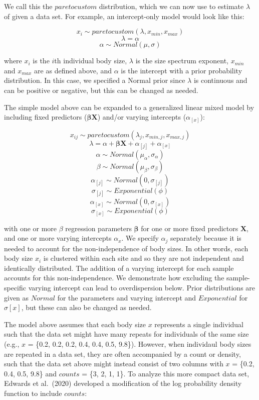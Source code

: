 \documentclass[
  12pt,
]{article}
\begin{document}
We call this the \(paretocustom\) distribution, which we can now use to
estimate \(\lambda\) of given a data set. For example, an intercept-only
model would look like this:

\[x_i \sim paretocustom(\lambda, x_{min}, x_{max})\]
\[\lambda = \alpha\] \[\alpha \sim Normal(\mu, \sigma)\]

where \(x_i\) is the \(i\)th individual body size, \(\lambda\) is the
size spectrum exponent, \(x_{min}\) and \(x_{max}\) are as defined
above, and \(\alpha\) is the intercept with a prior probability
distribution. In this case, we specified a Normal prior since
\(\lambda\) is continuous and can be positive or negative, but this can
be changed as needed.

The simple model above can be expanded to a generalized linear mixed
model by including fixed predictors (\(\boldsymbol\beta \textbf{X}\))
and/or varying intercepts (\(\alpha_{[x]}\)):

\[x_{ij} \sim paretocustom(\lambda_j, x_{min, j}, x_{max, j})\]
\[\lambda = \alpha + \boldsymbol\beta \textbf{X} + \alpha_{[j]} + \alpha_{[x]}\]
\[\alpha \sim Normal(\mu_{\alpha}, \sigma_{\alpha})\]
\[\beta \sim Normal(\mu_{\beta},\sigma_{\beta})\]
\[\alpha_{[j]} \sim Normal(0, \sigma_{[j]})\]
\[\sigma_{[j]} \sim Exponential(\phi)\]
\[\alpha_{[x]} \sim Normal(0, \sigma_{[x]})\]
\[\sigma_{[x]} \sim Exponential(\phi)\]

with one or more \(\beta\) regression parameters \(\boldsymbol\beta\)
for one or more fixed predictors \(\textbf{X}\), and one or more varying
intercepts \(\alpha_x\). We specify \(\alpha_{j}\) separately because it
is needed to account for the non-independence of body sizes. In other
words, each body size \(x_i\) is clustered within each site and so they
are not independent and identically distributed. The addition of a
varying intercept for each sample accounts for this non-independence. We
demonstrate how excluding the sample-specific varying intercept can lead
to overdispersion below. Prior distributions are given as \(Normal\) for
the parameters and varying intercept and \(Exponential\) for
\(\sigma{[x]}\), but these can also be changed as needed.

The model above assumes that each body size \(x\) represents a single
individual such that the data set might have many repeats for
individuals of the same size (e.g., \(x\) = \{0.2, 0.2, 0.2, 0.4, 0.4,
0.5, 9.8\}). However, when individaul body sizes are repeated in a data
set, they are often accompanied by a count or density, such that the
data set above might instead consist of two columns with \(x\) = \{0.2,
0.4, 0.5, 9.8\} and \(counts\) = \{3, 2, 1, 1\}. To analyze this more
compact data set, Edwards et al.~(2020) developed a modification of the
log probability density function to include \(counts\):
\end{document}
